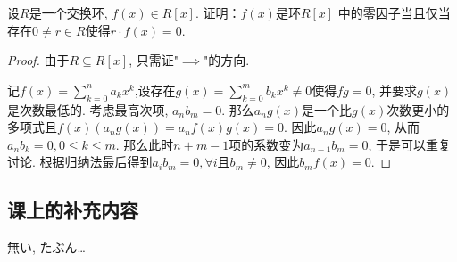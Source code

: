 \documentclass{../solutions-cn}
\begin{document}
\begin{exercise}[习题2.3.8]
    设$R$是一个交换环, $f(x) \in R[x]$. 证明：$f(x)$是环$R[x]$
中的零因子当且仅当存在$0 \neq r \in R$使得$r \cdot f(x) = 0$.
\end{exercise}

\begin{proof}
    由于$R \subseteq R[x]$, 只需证"$\implies$"的方向.

    记$f(x) = \sum_{k = 0}^{n} a_kx^k$,设存在$g(x) = \sum_{k = 0}^{m} b_kx^k \neq 0$使得$fg = 0$, 并要求$g(x)$是次数最低的. 考虑最高次项, $a_nb_m = 0$. 那么$a_ng(x)$是一个比$g(x)$次数更小的多项式且$f(x)(a_ng(x)) = a_nf(x)g(x) = 0$. 因此$a_ng(x) = 0$, 从而$a_nb_k = 0, 0 \leqslant k \leqslant m$. 那么此时$n + m - 1$项的系数变为$a_{n - 1}b_m = 0$, 于是可以重复讨论. 根据归纳法最后得到$a_ib_m = 0, \forall i$且$b_m \neq 0$, 因此$b_mf(x) = 0$.
\end{proof}

\subsection*{课上的补充内容}
    無い, たぶん\dots
\end{document}
